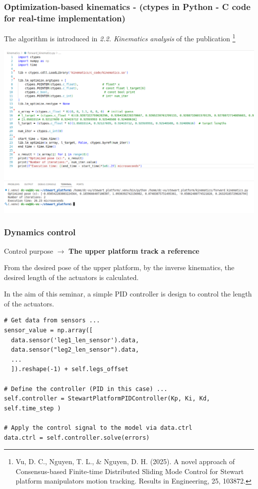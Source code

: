 \documentclass[9pt]{beamer}
\begin{document}
			\begin{frame}[fragile]
				\frametitle{Optimization-based kinematics - (ctypes in Python - C code for real-time implementation)}
				The algorithm is introduced in \textit{2.2. Kinematics analysis} of the publication \footnote{Vu, D. C., Nguyen, T. L., \& Nguyen, D. H. (2025). A novel approach of Consensus-based Finite-time Distributed Sliding Mode Control for Stewart platform manipulators motion tracking. Results in Engineering, 25, 103872.}
				\begin{center}
					\includegraphics[width=1\linewidth]{images/vscode-fk-stewart}
				\end{center}
			\end{frame}
		
			\begin{frame}[fragile]
				\frametitle{Dynamics control}
				
				Control purpose $\to$ \textbf{The upper platform track a reference}
				
				From the desired pose of the upper platform, by the inverse kinematics, the desired length of the actuators is calculated.
				
				In the aim of this seminar, a simple PID controller is design to control the length of the actuators. 
				
					\begin{verbatim}
# Get data from sensors ...
sensor_value = np.array([
  data.sensor('leg1_len_sensor').data,
  data.sensor("leg2_len_sensor").data,
  ...
  ]).reshape(-1) + self.legs_offset
  
# Define the controller (PID in this case) ...
self.controller = StewartPlatformPIDController(Kp, Ki, Kd, self.time_step )
 
# Apply the control signal to the model via data.ctrl
data.ctrl = self.controller.solve(errors)
					\end{verbatim}
			\end{frame}
		
\end{document}
